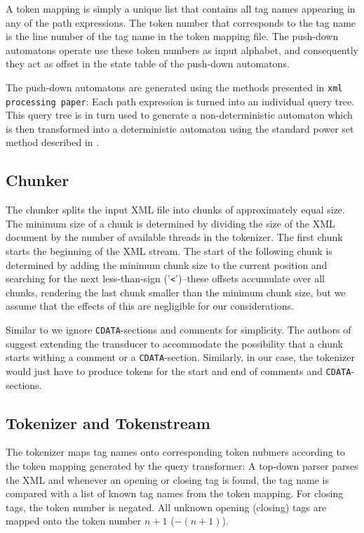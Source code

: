 A token mapping is simply a unique list that contains all tag names appearing in
any of the path expressions. The token number that corresponds to the tag name
is the line number of the tag name in the token mapping file. The push-down
automatons operate use these token numbers as input alphabet, and consequently
they act as offset in the state table of the push-down automatons.

The push-down automatons are generated using the methods presented in
\texttt{xml processing paper}: Each path expression is turned into an individual
query tree. This query tree is in turn used to generate a non-deterministic
automaton which is then transformed into a deterministic automaton using
the standard power set method described in .

\subsection{Chunker}

The chunker splits the input XML file into chunks of approximately equal size.
The minimum size of a chunk is determined by dividing the size of the XML
document by the number of available threads in the tokenizer. The first chunk
starts the beginning of the XML stream. The start of the following chunk is
determined by adding the minimum chunk size to the current position and
searching for the next less-than-sign ('\texttt{<}')–these offsets accumulate over
all chunks, rendering the last chunk smaller than the minimum chunk size, but we
assume that the effects of this are negligible for our considerations.

Similar to  we ignore \texttt{CDATA}-sections and comments for
simplicity. The authors of  suggest extending the transducer to
accommodate the possibility that a chunk starts withing a comment or a
\texttt{CDATA}-section. Similarly, in our case, the tokenizer would just have to
produce tokens for the start and end of comments and \texttt{CDATA}-sections.

\subsection{Tokenizer and Tokenstream}

The tokenizer maps tag names onto corresponding token nubmers according to the
token mapping generated by the query transformer: A top-down parser parses the
XML and whenever an opening or closing tag is found, the tag name is compared
with a list of known tag names from the token mapping. For closing tags, the
token number is negated. All unknown opening (closing) tags are mapped onto
the token number $n+1$ ($-(n+1)$).


